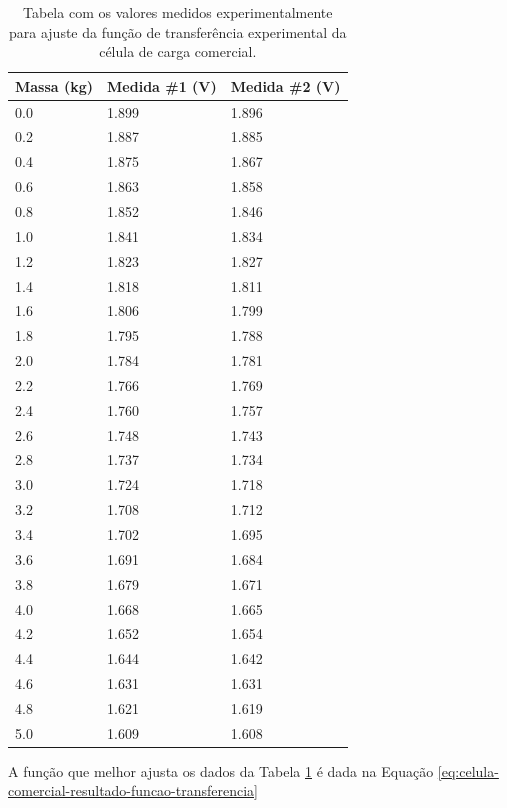 \documentclass[a4paper]{instrumentacao}
\begin{document}
\begin{table}[H]
\centering
\caption{Tabela com os valores medidos experimentalmente para ajuste da função de transferência experimental da célula de carga comercial.}
\begin{tabular}{|l|l|l|}

\hline
\textbf{Massa (kg)} & \textbf{Medida \#1 (V)} & \textbf{Medida \#2 (V)} \\ \hline
0.0 & 1.899 & 1.896 \\ \hline
0.2 & 1.887 & 1.885 \\ \hline
0.4 & 1.875 & 1.867 \\ \hline
0.6 & 1.863 & 1.858 \\ \hline
0.8 & 1.852 & 1.846 \\ \hline
1.0 & 1.841 & 1.834 \\ \hline
1.2 & 1.823 & 1.827 \\ \hline
1.4 & 1.818 & 1.811 \\ \hline
1.6 & 1.806 & 1.799 \\ \hline
1.8 & 1.795 & 1.788 \\ \hline
2.0 & 1.784 & 1.781 \\ \hline
2.2 & 1.766 & 1.769 \\ \hline
2.4 & 1.760 & 1.757 \\ \hline
2.6 & 1.748 & 1.743 \\ \hline
2.8 & 1.737 & 1.734 \\ \hline
3.0 & 1.724 & 1.718 \\ \hline
3.2 & 1.708 & 1.712 \\ \hline
3.4 & 1.702 & 1.695 \\ \hline
3.6 & 1.691 & 1.684 \\ \hline
3.8 & 1.679 & 1.671 \\ \hline
4.0 & 1.668 & 1.665 \\ \hline
4.2 & 1.652 & 1.654 \\ \hline
4.4 & 1.644 & 1.642 \\ \hline
4.6 & 1.631 & 1.631 \\ \hline
4.8 & 1.621 & 1.619 \\ \hline
5.0 & 1.609 & 1.608 \\ \hline

\end{tabular}
\label{tab:celula-comercial-resultado-funcao-transferencia}
\end{table}

A função que melhor ajusta os dados da Tabela \ref{tab:celula-comercial-resultado-funcao-transferencia} é dada na Equação \ref{eq:celula-comercial-resultado-funcao-transferencia}
\end{document}
